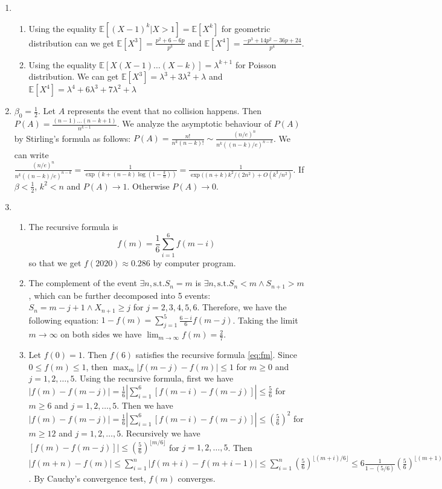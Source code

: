 \documentclass{article}
\begin{document}
\begin{enumerate}
\item
\begin{enumerate}
    \item Using the equality
    $\mathbb{E}[(X-1)^k | X>1] = \mathbb{E}[X^k]$ 
    for geometric distribution can
    we get
    $\mathbb{E}[X^3] = \frac{p^2+6-6p}{p^3}$
    and $\mathbb{E}[X^4] = \frac{-p^3+14p^2-36p+24}{p^4}$.
    \item Using the equality
    $\mathbb{E}[X(X-1)\dots(X-k)]
    =\lambda^{k+1}$
    for Poisson distribution.
    We can get
    $\mathbb{E}[X^3]=\lambda^3+3\lambda^2+\lambda$
    and
    $\mathbb{E}[X^4]=\lambda^4+6\lambda^3+
    7\lambda^2+\lambda$
\end{enumerate}
\item $\beta_0=\frac{1}{2}$.
Let $A$ represents the event that no collision
happens. Then $P(A) = \frac{(n-1) \dots (n-k+1)}{n^{k-1}}$. We analyze the asymptotic behaviour of $P(A)$ by Stirling's formula as follows:
$P(A) = \frac{n!}{n^k (n-k)!} \sim \frac{(n/e)^n}{n^k ((n-k)/e)^{n-k}}$. We can write
$\frac{(n/e)^n}{n^k ((n-k)/e)^{n-k}}=\frac{1}{\exp(k+(n-k)\log(1-\frac{k}{n}))}=\frac{1}{\exp((n+k)k^2/(2n^2) + O(k^3/n^2)}$.
If $\beta < \frac{1}{2}$, $k^2 < n$ and $P(A) \to 1$.
Otherwise $P(A) \to 0$.
\item 
\begin{enumerate}
    \item The recursive formula is
    \begin{equation}\label{eq:fm}
    f(m) = \frac{1}{6}\sum_{i=1}^6 f(m-i)
    \end{equation}
    so that we get
    $f(2020)\approx 0.286$ by computer program.
    \item The complement of the event $\exists n, \textrm{s.t.} S_n=m$
    is $\exists n,\textrm{s.t.} S_n<m \wedge S_{n+1} > m$, which can
    be further decomposed into 5 events: $S_n = m-j+1 \wedge X_{n+1} \geq j$ for $j=2,3,4,5,6$. Therefore, we have the following equation:
    $1-f(m)=\sum_{j=1}^5 \frac{6-i}{6}f(m-j)$. Taking the limit $m\to \infty$
    on both sides we have $\lim_{m\to\infty}f(m)=\frac{2}{7}$.
    \item
    Let $f(0)=1$. Then $f(6)$ satisfies the recursive formula
    \eqref{eq:fm}.
        Since $0 \leq f(m)\leq 1$, then $\max_{m} |f(m-j)-f(m)| \leq 1$
        for $m\geq 0$ and $j=1,2,\dots, 5$. Using the recursive
        formula,
    first we have
    $|f(m)-f(m-j)|=\frac{1}{6}|\sum_{i=1}^6 [f(m-i)-f(m-j)]| \leq \frac{5}{6}$ for $m\geq 6$ and $j=1,2,\dots, 5$.
    Then we have $|f(m)-f(m-j)|=\frac{1}{6}|\sum_{i=1}^6 [f(m-i)-f(m-j)]| \leq (\frac{5}{6})^2$ for $m\geq 12$ and $j=1,2,\dots, 5$.
    Recursively we have
    $[f(m)-f(m-j)]| \leq (\frac{5}{6})^{\lfloor m/6 \rfloor} $ for $j=1,2,\dots, 5$.
    Then
    $|f(m+n)-f(m)|\leq 
    \sum_{i=1}^n |f(m+i)-f(m+i-1)| \leq \sum_{i=1}^n (\frac{5}{6})^{\lfloor (m+i)/6 \rfloor} \leq
    6 \frac{1}{1-(5/6)} (\frac{5}{6})^{\lfloor (m+1)/6 \rfloor}=36 (\frac{5}{6})^{\lfloor (m+1)/6 \rfloor}$.
    By Cauchy's convergence test, $f(m)$ converges.
\end{enumerate}
\end{enumerate}
\end{document}
